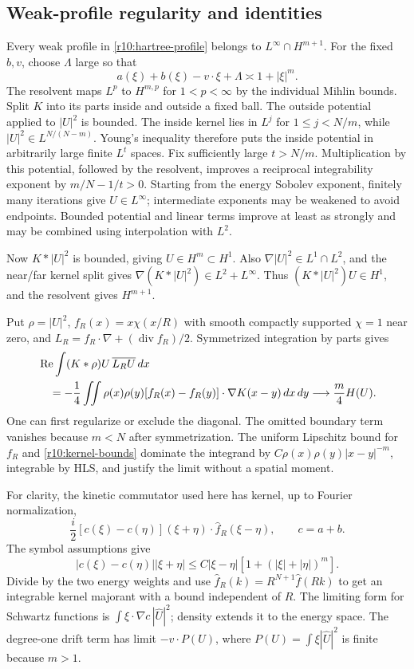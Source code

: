 \subsection{Weak-profile regularity and identities}

Every weak profile in \eqref{r10:hartree-profile} belongs to
$L^\infty\cap H^{m+1}$. For the fixed $b,v$, choose $\Lambda$ large
so that
\[
 a(\xi)+b(\xi)-v\cdot\xi+\Lambda\asymp1+|\xi|^m.
\]
The resolvent maps $L^p$ to $H^{m,p}$ for $1<p<\infty$ by the
individual Mihlin bounds. Split $K$ into its parts inside and outside
a fixed ball. The outside potential applied to $|U|^2$ is bounded.
The inside kernel lies in $L^j$ for $1\le j<N/m$, while
$|U|^2\in L^{N/(N-m)}$. Young's inequality therefore puts the
inside potential in arbitrarily large finite $L^t$ spaces.
Fix sufficiently large $t>N/m$. Multiplication by this potential,
followed by the resolvent, improves a reciprocal integrability
exponent by $m/N-1/t>0$. Starting from the energy Sobolev exponent,
finitely many iterations give $U\in L^\infty$; intermediate
exponents may be weakened to avoid endpoints. Bounded potential
and linear terms improve at least as strongly and may be combined
using interpolation with $L^2$.

Now $K*|U|^2$ is bounded, giving $U\in H^m\subset H^1$.
Also $\nabla |U|^2\in L^1\cap L^2$, and the near/far kernel split
gives $\nabla(K*|U|^2)\in L^2+L^\infty$.
Thus $(K*|U|^2)U\in H^1$, and the resolvent gives $H^{m+1}$.

Put $\rho=|U|^2$, $f_R(x)=x\chi(x/R)$ with smooth compactly
supported $\chi=1$ near zero, and
$L_R=f_R\cdot\nabla+(\operatorname{div}f_R)/2$.
Symmetrized integration by parts gives
\begin{align}
 &\operatorname{Re}\int(K*\rho)U\,\overline{L_RU}\,dx\notag\\
 &\quad=-\frac14\iint\rho(x)\rho(y)
       [f_R(x)-f_R(y)]\cdot\nabla K(x-y)\,dx\,dy
 \longrightarrow\frac m4H(U).
 \label{r10:hartree-cutoff}
\end{align}
One can first regularize or exclude the diagonal. The omitted
boundary term vanishes because $m<N$ after symmetrization.
The uniform Lipschitz bound for $f_R$ and
\eqref{r10:kernel-bounds} dominate the integrand by
$C\rho(x)\rho(y)|x-y|^{-m}$, integrable by HLS, and justify the
limit without a spatial moment.

For clarity, the kinetic commutator used here has kernel, up to
Fourier normalization,
\[
 \frac i2[c(\xi)-c(\eta)](\xi+\eta)\cdot
                    \widehat f_R(\xi-\eta),\qquad c=a+b.
\]
The symbol assumptions give
\[
 |c(\xi)-c(\eta)||\xi+\eta|
 \le C|\xi-\eta|[1+(|\xi|+|\eta|)^m].
\]
Divide by the two energy weights and use
$\widehat f_R(k)=R^{N+1}\widehat f(Rk)$ to get an integrable kernel
majorant with a bound independent of $R$. The limiting form for
Schwartz functions is $\int\xi\cdot\nabla c\,|\widehat U|^2$;
density extends it to the energy space. The degree-one drift term
has limit $-v\cdot P(U)$, where
$P(U)=\int\xi|\widehat U|^2$ is finite because $m>1$.

